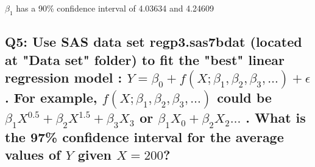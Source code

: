 \documentclass[a4paper,man,natbib]{apa6}
\begin{document}
$\beta_1$ has a 90\% confidence interval of 4.03634 and 4.24609




\subsection*{Q5: Use SAS data set regp3.sas7bdat (located at "Data set" folder) to fit the "best" linear regression model : $Y = \beta_0 + f(X; \beta_1, \beta_2, \beta_3, \ldots) + \epsilon$. For example, $f(X; \beta_1, \beta_2, \beta_3, \ldots)$ could be $\beta_1X^{0.5} + \beta_2 X^{1.5} + \beta_3 X_3$ or $\beta_1X_0 + \beta_2 X_2 \ldots$ . What is the 97\% confidence interval for the average values of $Y$ given $X=200$? }
\inputminted[breaklines,bgcolor=light-gray]{sas}{./Snippets/DAT502-HW6-5.sas}

\end{document}
